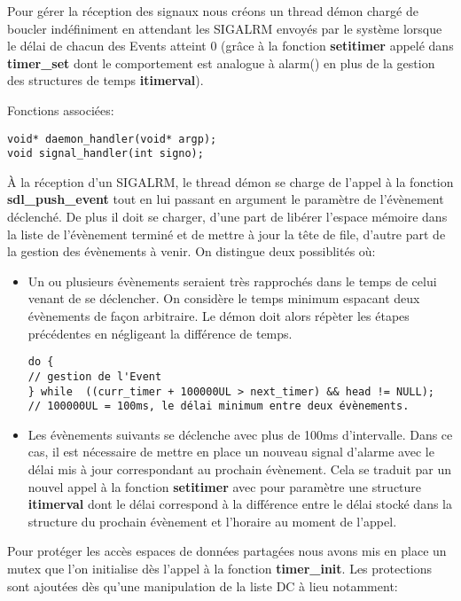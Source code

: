 \documentclass[a4paper]{article}
\begin{document}
Pour gérer la réception des signaux nous créons un thread démon chargé de boucler indéfiniment en attendant les SIGALRM envoyés par le système lorsque le délai de chacun des Events atteint 0 (grâce à la fonction \textbf{setitimer} appelé dans \textbf{timer\_set} dont le comportement est analogue à alarm() en plus de la gestion des structures de temps \textbf{itimerval}).

Fonctions associées:
\begin{verbatim}
void* daemon_handler(void* argp);
void signal_handler(int signo);
\end{verbatim}

À la réception d'un SIGALRM, le thread démon se charge de l'appel à la fonction \textbf{sdl\_push\_event} tout en lui passant en argument le paramètre de l'évènement déclenché. De plus il doit se charger, d'une part de libérer l'espace mémoire dans la liste de l'évènement terminé et de mettre à jour la tête de file, d'autre part de la gestion des évènements à venir. On distingue deux possiblités où: 

\begin{itemize}
\item Un ou plusieurs évènements seraient très rapprochés dans le temps de celui venant de se déclencher. On considère le temps minimum espacant deux évènements de façon arbitraire. Le démon doit alors répèter les étapes précédentes en négligeant la différence de temps.
\begin{verbatim}
do { 
// gestion de l'Event
} while  ((curr_timer + 100000UL > next_timer) && head != NULL); 
// 100000UL = 100ms, le délai minimum entre deux évènements.
\end{verbatim}

\item Les évènements suivants se déclenche avec plus de 100ms d'intervalle. Dans ce cas, il est nécessaire de mettre en place un nouveau signal d'alarme avec le délai mis à jour correspondant au prochain évènement. Cela se traduit par un nouvel appel à la fonction \textbf{setitimer} avec pour paramètre une structure \textbf{itimerval} dont le délai correspond à la différence entre le délai stocké dans la structure du prochain évènement et l'horaire au moment de l'appel.
\end{itemize}

Pour protéger les accès espaces de données partagées nous avons mis en place un mutex que l'on initialise dès l'appel à la fonction \textbf{timer\_init}. Les protections sont ajoutées dès qu'une manipulation de la liste DC à lieu notamment:
\end{document}
